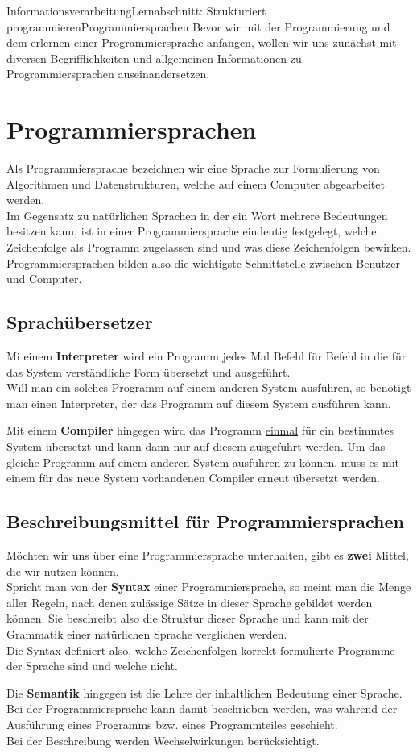 \documentclass[11pt,oneside,openany,headings=optiontotoc,11pt,numbers=noenddot]{article}
\begin{document}
	\begin{worksheet}{Informationsverarbeitung}{Lernabschnitt: Strukturiert programmieren}{Programmiersprachen}
		\setlength{\columnseprule}{0pt}
		\noindent
		Bevor wir mit der Programmierung und dem erlernen einer Programmiersprache anfangen, wollen wir uns zunächst mit diversen Begrifflichkeiten und allgemeinen Informationen zu Programmiersprachen auseinandersetzen.
		\section{Programmiersprachen}
		Als Programmiersprache bezeichnen wir eine Sprache zur Formulierung von Algorithmen und Datenstrukturen, welche auf einem Computer abgearbeitet werden.\\
		Im Gegensatz zu natürlichen Sprachen in der ein Wort mehrere Bedeutungen besitzen kann, ist in einer Programmiersprache eindeutig festgelegt, welche Zeichenfolge als Programm zugelassen sind und was diese Zeichenfolgen bewirken.\\
		Programmiersprachen bilden also die wichtigste Schnittstelle zwischen Benutzer und Computer.
		\subsection{Sprachübersetzer}
		Mi einem \textbf{Interpreter} wird ein Programm jedes Mal Befehl für Befehl in die für das System verständliche Form übersetzt und ausgeführt.\\
		Will man ein solches Programm auf einem anderen System ausführen, so benötigt man einen Interpreter, der das Programm auf diesem System ausführen kann.\\
		\par\noindent
		Mit einem \textbf{Compiler} hingegen wird das Programm \underline{einmal} für ein bestimmtes System übersetzt und kann dann nur auf diesem ausgeführt werden. Um das gleiche Programm auf einem anderen System ausführen zu können, muss es mit einem für das neue System vorhandenen Compiler erneut übersetzt werden.
		\subsection{Beschreibungsmittel für Programmiersprachen}
		Möchten wir uns über eine Programmiersprache unterhalten, gibt es \textbf{zwei} Mittel, die wir nutzen können.\\
		Spricht man von der \textbf{Syntax} einer Programmiersprache, so meint man die Menge aller Regeln, nach denen zulässige Sätze in dieser Sprache gebildet werden können. Sie beschreibt also die Struktur dieser Sprache und kann mit der Grammatik einer natürlichen Sprache verglichen werden.\\
		Die Syntax definiert also, welche Zeichenfolgen korrekt formulierte Programme der Sprache sind und welche nicht.\\
		\par\noindent
		Die \textbf{Semantik} hingegen ist die Lehre der inhaltlichen Bedeutung einer Sprache. Bei der Programmiersprache kann damit beschrieben werden, was während der Ausführung eines Programms bzw. eines Programmteiles geschieht.\\
		Bei der Beschreibung werden Wechselwirkungen berücksichtigt.

\end{worksheet}
\end{document}
